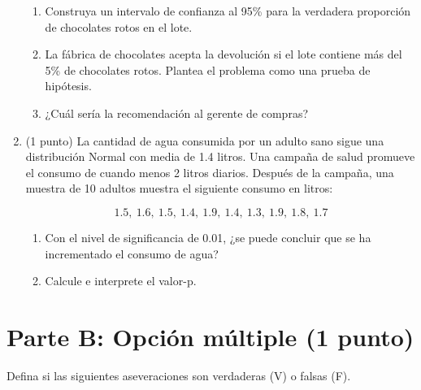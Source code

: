 \documentclass[12pt]{article}
\begin{document}
\begin{enumerate}
	      \begin{enumerate}
		      \item Construya un intervalo de confianza al 95\% para la verdadera proporción de
		            chocolates rotos en el lote.
		      \item La fábrica de chocolates acepta la devolución si el lote contiene más del 5\%
		            de chocolates rotos. Plantea el problema como una prueba de hipótesis.
		      \item ¿Cuál sería la recomendación al gerente de compras?
	      \end{enumerate}

	\item (1 punto) La cantidad de agua consumida por un adulto sano sigue una distribución Normal con media de 1.4 litros. Una campaña de salud promueve el consumo de cuando menos 2 litros diarios. Después de la campaña, una muestra de 10 adultos muestra el siguiente consumo en litros:

	      \[
		      1.5,\ 1.6,\ 1.5,\ 1.4,\ 1.9,\ 1.4,\ 1.3,\ 1.9,\ 1.8,\ 1.7
	      \]

	      \begin{enumerate}
		      \item Con el nivel de significancia de 0.01, ¿se puede concluir que se ha
		            incrementado el consumo de agua?
		      \item Calcule e interprete el valor-p.
	      \end{enumerate}
\end{enumerate}

\section*{Parte B: Opción múltiple (1 punto)}

Defina si las siguientes aseveraciones son verdaderas (V) o falsas (F).
\end{document}
